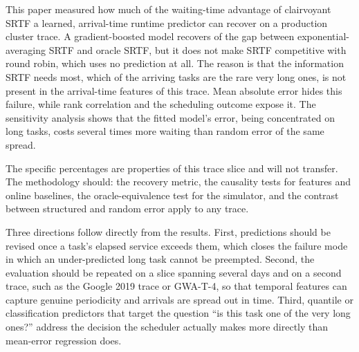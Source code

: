 \documentclass[conference]{IEEEtran}
\begin{document}
This paper measured how much of the waiting-time advantage of clairvoyant
SRTF a learned, arrival-time runtime predictor can recover on a production
cluster trace. A gradient-boosted model recovers \headline{} of the gap
between exponential-averaging SRTF and oracle SRTF, but it does not make
SRTF competitive with round robin, which uses no prediction at all. The
reason is that the information SRTF needs most, which of the arriving tasks
are the rare very long ones, is not present in the arrival-time features of
this trace. Mean absolute error hides this failure, while rank correlation
and the scheduling outcome expose it. The sensitivity analysis shows that
the fitted model's error, being concentrated on long tasks, costs several
times more waiting than random error of the same spread.

The specific percentages are properties of this trace slice and will not
transfer. The methodology should: the recovery metric, the causality tests
for features and online baselines, the oracle-equivalence test for the
simulator, and the contrast between structured and random error apply to
any trace.

Three directions follow directly from the results. First, predictions should
be revised once a task's elapsed service exceeds them, which closes the
failure mode in which an under-predicted long task cannot be preempted.
Second, the evaluation should be repeated on a slice spanning several days
and on a second trace, such as the Google 2019 trace or GWA-T-4, so that
temporal features can capture genuine periodicity and arrivals are spread
out in time. Third, quantile or classification predictors that target the
question ``is this task one of the very long ones?'' address the decision
the scheduler actually makes more directly than mean-error regression does.



\end{document}
